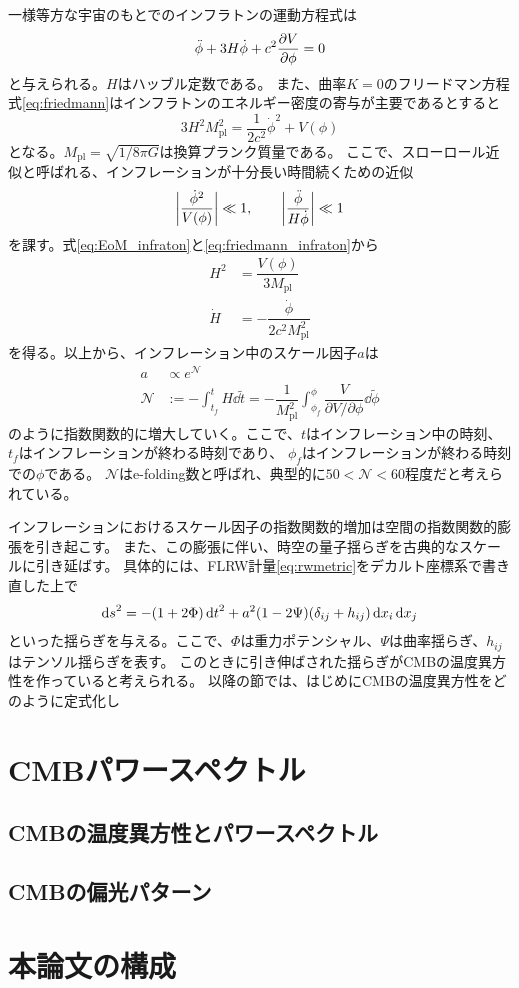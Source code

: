 \documentclass[../../main.tex]{subfiles}
\begin{document}
一様等方な宇宙のもとでのインフラトンの運動方程式は
\begin{equation}
    \label{eq:EoM_infraton}
    \ddot{\phi}+3H\dot{\phi}+c^2\pdv{V}{\phi} = 0
\end{equation}
と与えられる。$H$はハッブル定数である。
また、曲率$K=0$のフリードマン方程式\eqref{eq:friedmann}はインフラトンのエネルギー密度の寄与が主要であるとすると
\begin{equation}
    \label{eq:friedmann_infraton}
    3H^2M_{\mathrm{pl}}^2 = \dfrac{1}{2c^2}\dot{\phi}^2 +V(\phi)
\end{equation}
となる。$M_{\mathrm{pl}}=\sqrt{1/8\pi G}$は換算プランク質量である。
ここで、スローロール近似と呼ばれる、インフレーションが十分長い時間続くための近似
\begin{align}
    \qty|\dfrac{\dot{\phi}^2}{V(\phi)}| \ll 1,\qquad \qty|\dfrac{\ddot{\phi}}{H\dot{\phi}}| \ll 1
\end{align}
を課す。式\eqref{eq:EoM_infraton}と\eqref{eq:friedmann_infraton}から
\begin{align}
    H^2 &= \dfrac{V(\phi)}{3M_{\mathrm{pl}}} \\
    \dot{H} &= -\dfrac{\dot{\phi}}{2c^2M_{\mathrm{pl}}^2}
\end{align}
を得る。以上から、インフレーション中のスケール因子$a$は
\begin{align}
    a&\propto e^{\mathcal{N}} \\
    \mathcal{N} &:= -\int_{t_f}^{t}H\dd{\tilde{t}} = -\dfrac{1}{M_{\mathrm{pl}}^2}\int_{\phi_f}^{\phi}\dfrac{V}{\partial V/\partial \phi}\dd{\tilde{\phi}}
\end{align}
のように指数関数的に増大していく。ここで、$t$はインフレーション中の時刻、$t_f$はインフレーションが終わる時刻であり、
$\phi_f$はインフレーションが終わる時刻での$\phi$である。
$\mathcal{N}$はe-folding数と呼ばれ、典型的に$50<\mathcal{N}<60$程度だと考えられている。

インフレーションにおけるスケール因子の指数関数的増加は空間の指数関数的膨張を引き起こす。
また、この膨張に伴い、時空の量子揺らぎを古典的なスケールに引き延ばす。
具体的には、FLRW計量\eqref{eq:rwmetric}をデカルト座標系で書き直した上で
\begin{equation}
    \dd{s}^2 = -\qty(1+2\Phi)\dd{t}^2 + a^2\qty(1-2\Psi)\qty(\delta_{ij}+h_{ij})\dd{x_i}\dd{x_j}
\end{equation}
といった揺らぎを与える。ここで、$\Phi$は重力ポテンシャル、$\Psi$は曲率揺らぎ、$h_{ij}$はテンソル揺らぎを表す。
このときに引き伸ばされた揺らぎがCMBの温度異方性を作っていると考えられる。
以降の節では、はじめにCMBの温度異方性をどのように定式化し

\section{CMBパワースペクトル}
\subsection{CMBの温度異方性とパワースペクトル}

\subsection{CMBの偏光パターン}

\section{本論文の構成}
\end{document}
